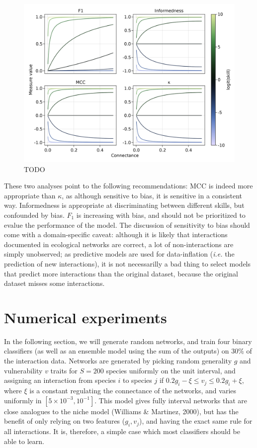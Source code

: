 \documentclass[11pt]{article}
\makeatletter
\def\maxwidth{\ifdim\Gin@nat@width>\linewidth\linewidth
\else\Gin@nat@width\fi}
\let\Oldincludegraphics\includegraphics
\renewcommand{\includegraphics}[1]{\Oldincludegraphics[width=\maxwidth]{#1}}
\makeatother
\begin{document}
\begin{figure}
\hypertarget{fig:connectance}{%
\centering
\includegraphics{figures/changing-connectance.png}
\caption{TODO}\label{fig:connectance}
}
\end{figure}

These two analyses point to the following recommendations: MCC is indeed
more appropriate than \(\kappa\), as although sensitive to bias, it is
sensitive in a consistent way. Informedness is appropriate at
discriminating between different skills, but confounded by bias. \(F_1\)
is increasing with bias, and should not be prioritized to evalue the
performance of the model. The discussion of sensitivity to bias should
come with a domain-specific caveat: although it is likely that
interactions documented in ecological networks are correct, a lot of
non-interactions are simply unobserved; as predictive models are used
for data-inflation (\emph{i.e.} the prediction of new interactions), it
is not necessarilly a bad thing to select models that predict more
interactions than the original dataset, because the original dataset
misses some interactions.

\hypertarget{numerical-experiments}{%
\section{Numerical experiments}\label{numerical-experiments}}

In the following section, we will generate random networks, and train
four binary classifiers (as well as an ensemble model using the sum of
the outputs) on 30\% of the interaction data. Networks are generated by
picking random generality \(g\) and vulnerability \(v\) traits for
\(S = 200\) species uniformly on the unit interval, and assigning an
interaction from species \(i\) to species \(j\) if
\(0.2g_i-\xi \le v_j \le 0.2g_i+\xi\), where \(\xi\) is a constant
regulating the connectance of the networks, and varies uniformly in
\([5\times 10^{-3}, 10^{-1}]\). This model gives fully interval networks
that are close analogues to the niche model (Williams \& Martinez,
2000), but has the benefit of only relying on two features
(\(g_i, v_j\)), and having the exact same rule for all interactions. It
is, therefore, a simple case which most classifiers should be able to
learn.
\end{document}
